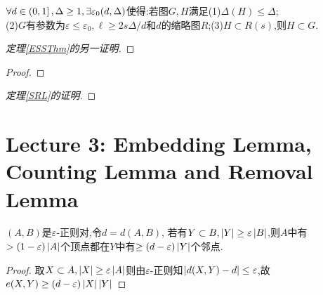 \documentclass[11pt]{article}
\begin{document}
\begin{lemma}[图嵌入引理]\label{GEL}
    $\forall d\in \left(0,1\right],\Delta\geq 1, \exists \varepsilon_0(d,\Delta)$使得:若图$G,H$满足(1)$\Delta(H)\leq \Delta$;\\
    (2)$G$有参数为$\varepsilon\leq \varepsilon_0, \ell\geq 2s\Delta/d$和$d$的缩略图$R$;(3)$H\subset R(s)$,则$H\subset G$.
\end{lemma}
\begin{proof}[定理\ref{ESSThm}的另一证明]
    
\end{proof}
\begin{definition}
    
\end{definition}
\begin{lemma}
    
\end{lemma}
\begin{lemma}
    
\end{lemma}
\begin{proof}
    
\end{proof}
\begin{proof}[定理\ref{SRL}的证明]
    
\end{proof}
\begin{theorem}
    
\end{theorem}

\newpage
\section{Lecture 3: Embedding Lemma, Counting Lemma and Removal Lemma}
\begin{lemma}
    $(A,B)$是$\varepsilon$-正则对,令$d=d(A,B)$, 若有$Y\subset B, \left|Y\right|\geq \varepsilon \left|B\right|$,则$A$中有$>(1-\varepsilon)\left|A\right|$个顶点都在$Y$中有$\geq (d-\varepsilon)\left|Y\right|$个邻点.
\end{lemma}
\begin{proof}
    取$X\subset A, \left|X\right|\geq \varepsilon\left|A\right|$则由$\varepsilon$-正则知$\left|d(X,Y)-d\right|\leq \varepsilon$,故$e(X,Y)\geq (d-\varepsilon)\left|X\right|\left|Y\right|$
\end{proof}
\end{document}

